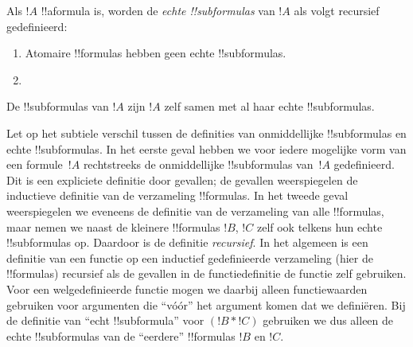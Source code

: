 \documentclass[openany]{memoir}
\begin{document}
\begin{defn}
Als $!A$ !!a{formula} is, worden de \emph{echte !!{subformula}s} van
$!A$ als volgt recursief gedefinieerd:
\begin{enumerate}
\item Atomaire !!{formula}s hebben geen echte !!{subformula}s.


\item {}


\end{enumerate}
\end{defn}

\begin{defn}[!!^{subformula}]
De !!{subformula}s van $!A$ zijn $!A$ zelf samen met al haar echte
!!{subformula}s.
\end{defn}

\begin{explain}
Let op het subtiele verschil tussen de definities van onmiddellijke
!!{subformula}s en echte !!{subformula}s. In het eerste geval hebben
we voor iedere mogelijke vorm van een formule~$!A$ rechtstreeks de
onmiddellijke !!{subformula}s van~$!A$ gedefinieerd. Dit is een
expliciete definitie door gevallen; de gevallen weerspiegelen de
inductieve definitie van de verzameling !!{formula}s. In het tweede
geval weerspiegelen we eveneens de definitie van de verzameling van
alle !!{formula}s, maar nemen we naast de kleinere !!{formula}s $!B$,
$!C$ zelf ook telkens hun echte !!{subformula}s op. Daardoor is de
definitie \emph{recursief}. In het algemeen is een definitie van een
functie op een inductief gedefinieerde verzameling (hier de
!!{formula}s) recursief als de gevallen in de functiedefinitie de
functie zelf gebruiken. Voor een welgedefinieerde functie mogen we
daarbij alleen functiewaarden gebruiken voor argumenten die ``vóór''
het argument komen dat we definiëren. Bij de definitie van ``echt
!!{subformula}'' voor $(!B \ast !C)$ gebruiken we dus alleen de echte
!!{subformula}s van de ``eerdere'' !!{formula}s $!B$ en $!C$.
\end{explain}
\end{document}
